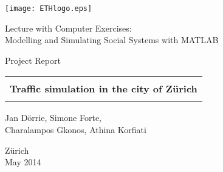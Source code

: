 \thispagestyle{empty}

\begin{center}
\texttt{[image: ETHlogo.eps]}

\bigskip


\bigskip


\bigskip


\LARGE{ Lecture with Computer Exercises:\\ }
\LARGE{ Modelling and Simulating Social Systems with MATLAB\\}

\bigskip

\bigskip

\small{Project Report}\\

\bigskip

\bigskip

\bigskip

\bigskip


\begin{tabular}{|c|}
\hline
\\
\textbf{\LARGE{Traffic simulation in the city of Z\"urich}}\\
\\
\hline
\end{tabular}
\bigskip

\bigskip

\bigskip

\LARGE{Jan D\"{o}rrie, Simone Forte, \\Charalampos Gkonos, Athina Korfiati}



\bigskip

\bigskip

\bigskip

\bigskip

\bigskip

\bigskip

\bigskip

\bigskip

Z\"urich\\
May 2014\\

\end{center}


